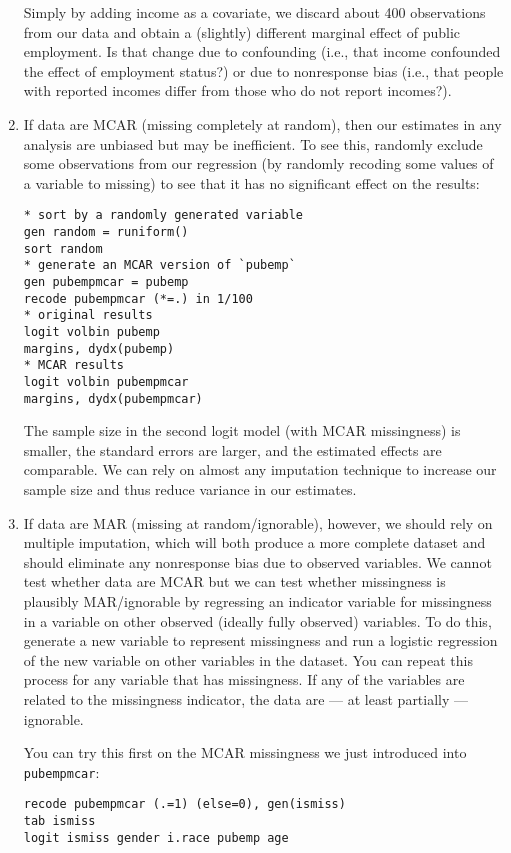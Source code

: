 \documentclass[a4paper,12pt]{article}
\begin{document}
\begin{enumerate}
Simply by adding income as a covariate, we discard about 400 observations from our data and obtain a (slightly) different marginal effect of public employment. Is that change due to confounding (i.e., that income confounded the effect of employment status?) or due to nonresponse bias (i.e., that people with reported incomes differ from those who do not report incomes?).

\item If data are MCAR (missing completely at random), then our estimates in any analysis are unbiased but may be inefficient. To see this, randomly exclude some observations from our regression (by randomly recoding some values of a variable to missing) to see that it has no significant effect on the results:
\begin{verbatim}
* sort by a randomly generated variable
gen random = runiform()
sort random
* generate an MCAR version of `pubemp`
gen pubempmcar = pubemp
recode pubempmcar (*=.) in 1/100
* original results
logit volbin pubemp
margins, dydx(pubemp)
* MCAR results
logit volbin pubempmcar
margins, dydx(pubempmcar)
\end{verbatim}

The sample size in the second logit model (with MCAR missingness) is smaller, the standard errors are larger, and the estimated effects are comparable. We can rely on almost any imputation technique to increase our sample size and thus reduce variance in our estimates.

\item If data are MAR (missing at random/ignorable), however, we should rely on multiple imputation, which will both produce a more complete dataset and should eliminate any nonresponse bias due to observed variables. We cannot test whether data are MCAR but we can test whether missingness is plausibly MAR/ignorable by regressing an indicator variable for missingness in a variable on other observed (ideally fully observed) variables. To do this, generate a new variable to represent missingness and run a logistic regression of the new variable on other variables in the dataset. You can repeat this process for any variable that has missingness. If any of the variables are related to the missingness indicator, the data are --- at least partially --- ignorable.

You can try this first on the MCAR missingness we just introduced into \texttt{pubempmcar}:
\begin{verbatim}
recode pubempmcar (.=1) (else=0), gen(ismiss)
tab ismiss
logit ismiss gender i.race pubemp age
\end{verbatim}


\end{enumerate}
\end{document}
